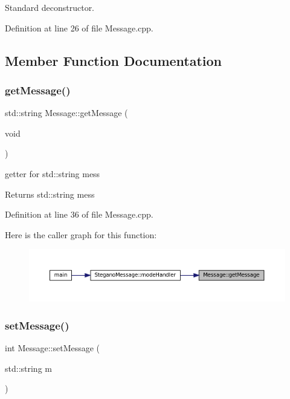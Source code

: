 Standard deconstructor. 

Definition at line 26 of file Message.\+cpp.



\subsection{Member Function Documentation}
\mbox{\label{classMessage_a8d2e67a8732ecaeca309df6ac5dda156}} 
\subsubsection{\texorpdfstring{getMessage()}{getMessage()}}
{\footnotesize\ttfamily std\+::string Message\+::get\+Message (\begin{DoxyParamCaption}\item[{void}]{ }\end{DoxyParamCaption})}



getter for std\+::string mess 

\begin{DoxyReturn}{Returns}
std\+::string mess 
\end{DoxyReturn}


Definition at line 36 of file Message.\+cpp.

Here is the caller graph for this function\+:
\nopagebreak
\begin{figure}[H]
\begin{center}
\leavevmode
\includegraphics[width=350pt]{classMessage_a8d2e67a8732ecaeca309df6ac5dda156_icgraph}
\end{center}
\end{figure}
\mbox{\label{classMessage_aa1e4c60f94308a9367ad3106c34b28f3}} 
\subsubsection{\texorpdfstring{setMessage()}{setMessage()}}
{\footnotesize\ttfamily int Message\+::set\+Message (\begin{DoxyParamCaption}\item[{std\+::string}]{m }\end{DoxyParamCaption})}



